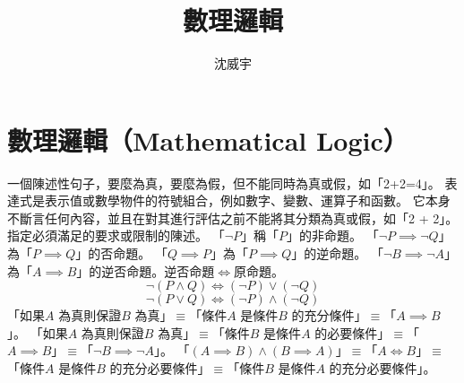 \documentclass[a4paper,12pt]{article}
\begin{document}
\title{數理邏輯}
\author{沈威宇}
\date{\temtoday}
\titletocdoc
\section{數理邏輯（Mathematical Logic）}
一個陳述性句子，要麼為真，要麼為假，但不能同時為真或假，如「2+2=4」。
表達式是表示值或數學物件的符號組合，例如數字、變數、運算子和函數。 它本身不斷言任何內容，並且在對其進行評估之前不能將其分類為真或假，如「2 + 2」。
指定必須滿足的要求或限制的陳述。
「$\neg P$」稱「$P$」的非命題。
「$\neg P \implies \neg Q$」為「$P \implies Q$」的否命題。
「$Q \implies P$」為「$P \implies Q$」的逆命題。
「\( \neg B \implies \neg A\)」為「\( A \implies B \)」的逆否命題。逆否命題$\iff$原命題。
\[\neg (P\land Q)\iff (\neg P)\lor (\neg Q)\]
\[\neg (P\lor Q)\iff (\neg P)\land (\neg Q)\]
 「如果\( A \) 為真則保證\( B \) 為真」$\equiv$「條件\( A \) 是條件\( B \) 的充分條件」$\equiv$「\( A \implies B \)」。
「如果\( A \) 為真則保證\( B \) 為真」$\equiv$「條件\( B \) 是條件\( A \) 的必要條件」$\equiv$「\( A \implies B \)」$\equiv$「\( \neg B \implies \neg A\)」。
「\( (A \implies B) \land (B \implies A) \)」$\equiv$「\( A \iff B\)」$\equiv$「條件\( A \) 是條件\( B \) 的充分必要條件」$\equiv$「條件\( B \) 是條件\( A \) 的充分必要條件」。
\end{document}
